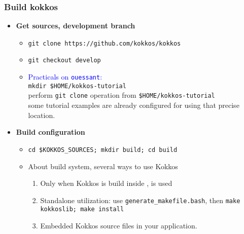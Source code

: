 \begin{frame}
  \frametitle{Build kokkos}

  \begin{itemize}
  \item \textbf{Get sources, development branch}
    \begin{itemize}
    \item \texttt{git clone https://github.com/kokkos/kokkos}
    \item \texttt{git checkout develop}
    \item \textcolor{blue}{Practicals on \texttt{ouessant}:}\\
      \texttt{mkdir \$HOME/kokkos-tutorial}\\
      perform \texttt{git clone} operation from \texttt{\$HOME/kokkos-tutorial}\\
      some tutorial examples are already configured for using that precise location.
    \end{itemize}
  \item \textbf{Build configuration}
    \begin{itemize}
    \item \texttt{cd \$KOKKOS\_SOURCES; mkdir build; cd build}
    \item About build system, several ways to use Kokkos
      \begin{enumerate}
      \item Only when Kokkos is build inside ,  is used
      \item Standalone utilization: use \texttt{generate\_makefile.bash}, then \texttt{make kokkoslib; make install}
      \item Embedded Kokkos source files in your application.
      \end{enumerate}
    \end{itemize}
  \end{itemize}
 
\end{frame}

